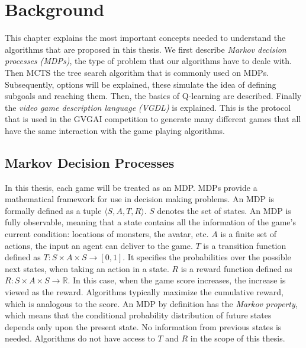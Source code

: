 \chapter{Background}
\label{sec:background}

This chapter explains the most important concepts needed to understand the
algorithms that are proposed in this thesis. We first describe \emph{Markov
decision processes (MDPs)}, the type of problem that our algorithms have to
deale with. Then  MCTS the tree search algorithm that is commonly used on MDPs.
Subsequently, options will be explained, these simulate the idea of defining
subgoals and reaching them.  Then, the basics of Q-learning are described.
Finally the \emph{video game description language (VGDL)} is explained. This is
the protocol that is used in the GVGAI competition to generate many different
games that all have the same interaction with the game playing algorithms.

\section{Markov Decision Processes}
\label{subsec:mdps}
In this thesis, each game will be treated as an MDP. MDPs provide a mathematical
framework for use in decision making problems. An MDP is formally defined as a
tuple $\langle S, A, T, R \rangle$. $S$ denotes the set of states. An MDP is
fully observable, meaning that a state contains all the information of the
game's current condition: locations of monsters, the avatar, etc. $A$ is a
finite set of actions, the input an agent can deliver to the game. $T$ is a
transition function defined as $T : S \times A \times S \rightarrow
\left[0,1\right]$. It specifies the probabilities over the possible next states,
when taking an action in a state.  $R$ is a reward function defined as $R: S
\times A \times S \rightarrow \mathbb{R}$. In this case, when the game score
increases, the increase is viewed as the reward. Algorithms typically maximize
the cumulative reward, which is analogous to the score. An MDP by definition has
the \emph{Markov property}, which means that the conditional probability
distribution of future states depends only upon the present state. No
information from previous states is needed. Algorithms do not have access to $T$
and $R$ in the scope of this thesis.

